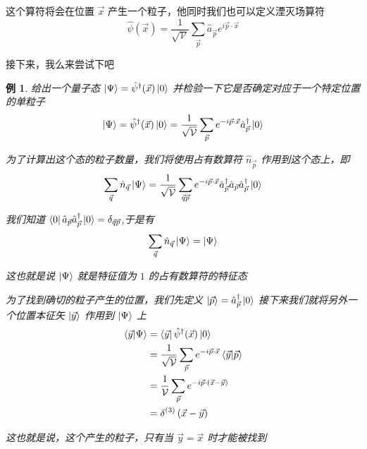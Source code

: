 \documentclass{article}
\newtheorem{example}{例}
\begin{document}
这个算符将会在位置 $\vec{x}$ 产生一个粒子，他同时我们也可以定义湮灭场算符
\begin{equation*}
    \hat{\psi} (\vec{x}) = \frac{1}{\sqrt{\mathcal{V}}}\sum_{\vec{p}} \hat{a}_{\vec{p}} e^{i\vec{p}\cdot \vec{x}}
\end{equation*}

接下来，我么来尝试下吧
\begin{example}
    给出一个量子态 $\ket{\Psi} = \hat{\psi}^\dagger (\vec{x})\ket{0}$ 并检验一下它是否确定对应于一个特定位置的单粒子
    \begin{equation*}
        \ket{\Psi} = \hat{\psi}^\dagger (\vec{x}) \ket{0} = \frac{1}{\sqrt{\mathcal{V}}} \sum_{\vec{p}} e^{-i\vec{p}\cdot\vec{x}} \hat{a}_{\vec{p}}^\dagger \ket{0}
    \end{equation*}

    为了计算出这个态的粒子数量，我们将使用占有数算符 $\hat{n}_{\vec{p}}$ 作用到这个态上，即 
    \begin{equation*}
        \sum_{\vec{q}} \hat{n}_{\vec{q}} \ket{\Psi} = \frac{1}{\sqrt{\mathcal{V}}} \sum_{\vec{q}\vec{p}} e^{-i\vec{p}\cdot\vec{x}} \hat{a}_{\vec{p}}^\dagger \hat{a}_{\vec{p}} \hat{a}_{\vec{p}}^\dagger \ket{0}
    \end{equation*}

    我们知道 $\bra{0} \hat{a}_{\vec{p}} \hat{a}_{\vec{p}}^\dagger \ket{0}  = \delta_{\vec{q}\vec{p}}$,于是有
    \begin{equation*}
        \sum_{\vec{q}} \hat{n}_{\vec{q}} \ket{\Psi} = \ket{\Psi}
    \end{equation*}

    这也就是说 $\ket{\Psi}$ 就是特征值为 $1$ 的占有数算符的特征态

    为了找到确切的粒子产生的位置，我们先定义 $\ket{\vec{p}} = \hat{a}_{\vec{p}}^\dagger \ket{0}$ 接下来我们就将另外一个位置本征矢 $\ket{\vec{y}}$ 作用到 $\ket{\Psi}$ 上 
    \begin{align*}
        \braket{\vec{y}}{\Psi} &= \bra{\vec{y}}\hat{\psi}^\dagger(\vec{x}) \ket{0} \\
        &= \frac{1}{\sqrt{\mathcal{V}}}\sum_{\vec{p}}e^{-i \vec{p}\cdot \vec{x}}\braket{\vec{y}}{\vec{p}} \\
        &= \frac{1}{\mathcal{V}} \sum_{\vec{p}}e^{-i\vec{p} \cdot \left(\vec{x} - \vec{y}\right)} \\
        &= \delta^{(3)}\left(\vec{x} - \vec{y}\right)
    \end{align*}

    这也就是说，这个产生的粒子，只有当 $\vec{y} = \vec{x}$ 时才能被找到
\end{example}
\end{document}
